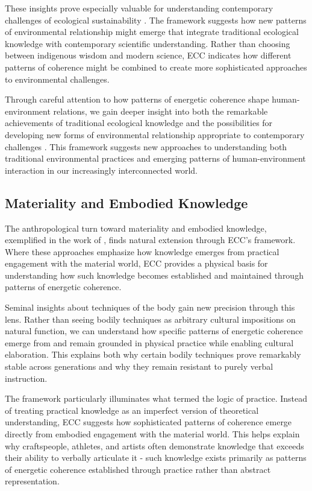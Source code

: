 \begin{refsection}
These insights prove especially valuable for understanding contemporary challenges of ecological sustainability \cite{viveiros2014cannibal}. The framework suggests how new patterns of environmental relationship might emerge that integrate traditional ecological knowledge with contemporary scientific understanding. Rather than choosing between indigenous wisdom and modern science, ECC indicates how different patterns of coherence might be combined to create more sophisticated approaches to environmental challenges.

Through careful attention to how patterns of energetic coherence shape human-environment relations, we gain deeper insight into both the remarkable achievements of traditional ecological knowledge and the possibilities for developing new forms of environmental relationship appropriate to contemporary challenges \cite{strathern1980nature}. This framework suggests new approaches to understanding both traditional environmental practices and emerging patterns of human-environment interaction in our increasingly interconnected world.

\subsection{Materiality and Embodied Knowledge}

The anthropological turn toward materiality and embodied knowledge, exemplified in the work of \cite{ingold2013making,jackson1989knowledge,csordas1990embodiment}, finds natural extension through ECC's framework. Where these approaches emphasize how knowledge emerges from practical engagement with the material world, ECC provides a physical basis for understanding how such knowledge becomes established and maintained through patterns of energetic coherence.

Seminal insights about techniques of the body \cite{mauss1935techniques} gain new precision through this lens. Rather than seeing bodily techniques as arbitrary cultural impositions on natural function, we can understand how specific patterns of energetic coherence emerge from and remain grounded in physical practice while enabling cultural elaboration. This explains both why certain bodily techniques prove remarkably stable across generations and why they remain resistant to purely verbal instruction.

The framework particularly illuminates what \cite{bourdieu1990logic} termed the logic of practice. Instead of treating practical knowledge as an imperfect version of theoretical understanding, ECC suggests how sophisticated patterns of coherence emerge directly from embodied engagement with the material world. This helps explain why craftspeople, athletes, and artists often demonstrate knowledge that exceeds their ability to verbally articulate it - such knowledge exists primarily as patterns of energetic coherence established through practice rather than abstract representation.


\end{refsection}
